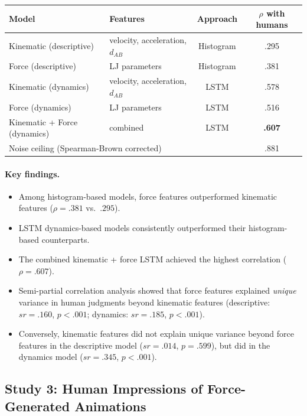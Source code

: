 \documentclass[11pt,a4paper]{article}
\begin{document}
\begin{center}
\renewcommand{\arraystretch}{1.3}
\begin{tabular}{llcc}
\toprule
\textbf{Model} & \textbf{Features} & \textbf{Approach} & \textbf{$\rho$ with humans} \\
\midrule
Kinematic (descriptive) & velocity, acceleration, $d_{AB}$ & Histogram & .295 \\
Force (descriptive) & LJ parameters & Histogram & .381 \\
Kinematic (dynamics) & velocity, acceleration, $d_{AB}$ & LSTM & .578 \\
Force (dynamics) & LJ parameters & LSTM & .516 \\
Kinematic + Force (dynamics) & combined & LSTM & \textbf{.607} \\
\midrule
\multicolumn{3}{l}{Noise ceiling (Spearman-Brown corrected)} & .881 \\
\bottomrule
\end{tabular}
\end{center}

\paragraph{Key findings.}
\begin{itemize}
    \item Among histogram-based models, force features outperformed kinematic features ($\rho = .381$ vs.\ $.295$).
    \item LSTM dynamics-based models consistently outperformed their histogram-based counterparts.
    \item The combined kinematic + force LSTM achieved the highest correlation ($\rho = .607$).
    \item Semi-partial correlation analysis showed that force features explained \emph{unique} variance in human judgments beyond kinematic features (descriptive: $sr = .160$, $p < .001$; dynamics: $sr = .185$, $p < .001$).
    \item Conversely, kinematic features did not explain unique variance beyond force features in the descriptive model ($sr = .014$, $p = .599$), but did in the dynamics model ($sr = .345$, $p < .001$).
\end{itemize}

\subsection{Study 3: Human Impressions of Force-Generated Animations}
\end{document}
